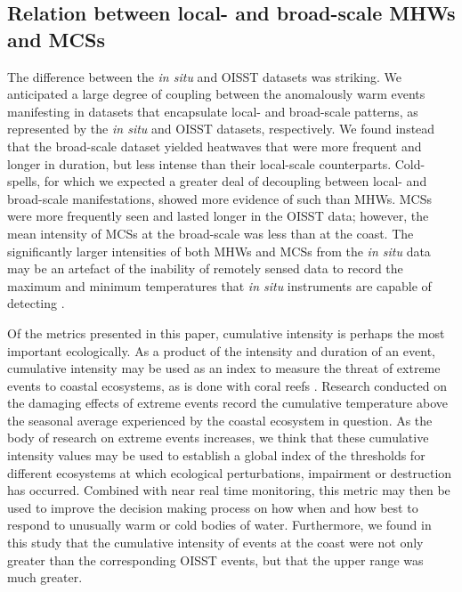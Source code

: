 \documentclass[a4paper,10pt,review]{elsarticle}
\begin{document}
\subsection{Relation between local- and broad-scale MHWs and MCSs}
The difference between the \emph{in situ} and OISST datasets was striking. We anticipated a large degree of coupling between the anomalously warm events manifesting in datasets that encapsulate local- and broad-scale patterns, as represented by the \emph{in situ} and OISST datasets, respectively. We found instead that the broad-scale dataset yielded heatwaves that were more frequent and longer in duration, but less intense than their local-scale counterparts. Cold-spells, for which we expected a greater deal of decoupling between local- and broad-scale manifestations, showed more evidence of such than MHWs. MCSs were more frequently seen and lasted longer in the OISST data; however, the mean intensity of MCSs at the broad-scale was less than at the coast. The significantly larger intensities of both MHWs and MCSs from the \emph{in situ} data may be an artefact of the inability of remotely sensed data to record the maximum and minimum temperatures that \emph{in situ} instruments are capable of detecting \citep{Smale2009}.

Of the metrics presented in this paper, cumulative intensity is perhaps the most important ecologically. As a product of the intensity and duration of an event, cumulative intensity may be used as an index to measure the threat of extreme events to coastal ecosystems, as is done with coral reefs \citep[e.g.][]{Selig2010}. Research conducted on the damaging effects of extreme events \citep[e.g.][]{Wernberg2013} record the cumulative temperature above the seasonal average experienced by the coastal ecosystem in question. As the body of research on extreme events increases, we think that these cumulative intensity values may be used to establish a global index of the thresholds for different ecosystems at which ecological perturbations, impairment or destruction has occurred. Combined with near real time monitoring, this metric may then be used to improve the decision making process on how when and how best to respond to unusually warm or cold bodies of water. Furthermore, we found in this study that the cumulative intensity of events at the coast were not only greater than the corresponding OISST events, but that the upper range was much greater.
\end{document}
